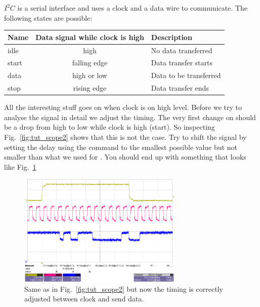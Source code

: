 $I^2C$ is a serial interface and uses a clock and a data wire to communicate. The following states are possible:

\bigskip

\begin{tabular}{lcl}
    \toprule
Name & Data signal while clock is high & Description \\
    \midrule
idle & high & No data transferred \\
start & falling edge & Data transfer starts \\
data & high or low & Data to be transferred \\
stop & rising edge & Data transfer ends \\
    \bottomrule
\end{tabular}

\bigskip

All the interesting stuff goes on when clock is on high level. Before we try to analyse the signal in detail we adjust the timing. The very first change on  should be a drop from high to low while clock is high (start). So inspecting Fig.~\ref{fig:tut_scope2} shows that this is not the case. Try to shift the signal by setting the delay using the  command to the smallest possible value but not smaller than what we used for . You should end up with something that looks like Fig.~\ref{fig:tut_scope3}

\begin{figure}[h]
    \begin{center}
	\includegraphics[width=0.7\textwidth]{img/tut_scope3.png}
	\caption{Same as in Fig.~\ref{fig:tut_scope2} but now the timing is correctly adjusted between clock and send data.}
	\label{fig:tut_scope3}
    \end{center}
\end{figure}

